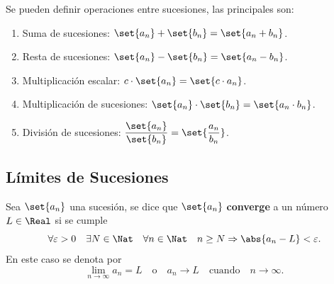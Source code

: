 \begin{frame}
  Se pueden definir operaciones entre sucesiones, las principales son:\\[0.5cm]
  \begin{enumerate}
    \item<2-> Suma de sucesiones: $\set{a_n}+\set{b_n}=\set{a_n+b_n}$.\\[0.25cm]
    \item<3-> Resta de sucesiones: $\set{a_n}-\set{b_n}=\set{a_n-b_n}$.\\[0.25cm]
    \item<4-> Multiplicación escalar: $c\cdot\set{a_n}=\set{c\cdot a_n}$.\\[0.25cm]
    \item<5-> Multiplicación de sucesiones: $\set{a_n}\cdot\set{b_n}=\set{a_n\cdot b_n}$.\\[0.25cm]
    \item<6-> División de sucesiones: $\dfrac{\set{a_n}}{\set{b_n}}=\set{\dfrac{a_n}{b_n}}$.\\[0.25cm]
  \end{enumerate}
\end{frame}


\subsection{Límites de Sucesiones}
\begin{frame}
\subsectionpage
\end{frame}


\begin{frame}
  \begin{defn}
    Sea $\set{a_n}$ una sucesión, se dice que $\set{a_n}$ \textbf{converge} a un número $L\in\Real$ si se cumple
    $$\forall\varepsilon>0\quad\exists N\in\Nat\quad\forall n\in\Nat\quad n\geq N\Rightarrow\abs{a_n-L}<\varepsilon.$$
    En este caso se denota por
    $$\lim_{n\to\infty}a_n=L\quad\text{o}\quad a_n\to L\quad\text{cuando}\quad n\to\infty.$$
  \end{defn}
\end{frame}

